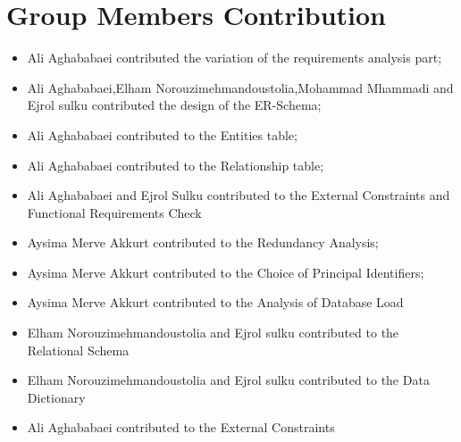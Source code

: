 \documentclass{article}
\begin{document}
\maketitle




\section{Group Members Contribution}
\begin{itemize}
        \item Ali Aghababaei contributed the variation of the requirements analysis part;
        \item Ali Aghababaei,Elham Norouzimehmandoustolia,Mohammad Mhammadi and Ejrol sulku contributed the design of the ER-Schema;
        \item Ali Aghababaei contributed to the Entities table;
        \item Ali Aghababaei contributed to the Relationship table;
        \item Ali Aghababaei and Ejrol Sulku contributed to the External Constraints and Functional Requirements Check
        \item Aysima Merve Akkurt contributed to the Redundancy Analysis;
        \item Aysima Merve Akkurt contributed to the Choice of Principal Identifiers;
        \item Aysima Merve Akkurt contributed to the Analysis of Database Load
        \item Elham Norouzimehmandoustolia and Ejrol sulku contributed to the Relational Schema
        \item Elham Norouzimehmandoustolia and Ejrol sulku contributed to the Data Dictionary
        \item Ali Aghababaei contributed to the External Constraints
    \end{itemize}
\end{document}
